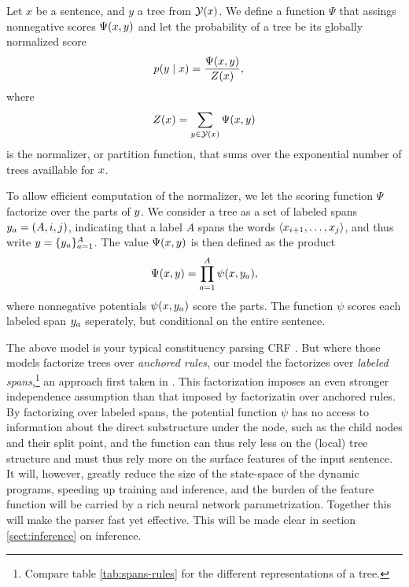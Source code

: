   Let $x$ be a sentence, and $y$ a tree from $\mathcal{Y}(x)$. We define a function $\Psi$ that assings nonnegative scores $\Psi(x, y)$ and let the probability of a tree be its globally normalized score
  \begin{align}
    \label{eq:crf-model}
    p(y \mid x) &= \frac{\Psi(x, y)}{Z(x)},
  \end{align}
  where
  \begin{align*}
    Z(x) = \sum_{ y \in \mathcal{Y}(x) } \Psi(x, y)
  \end{align*}
  is the normalizer, or partition function, that sums over the exponential number of trees availlable for $x$.

  To allow efficient computation of the normalizer, we let the scoring function $\Psi$ factorize over the parts of $y$. We consider a tree as a set of labeled spans $y_a = (A, i, j)$, indicating that a label $A$ spans the words $\langle x_{i+1}, \dots, x_j \rangle$, and thus write $y = \{ y_a \}_{a=1}^A$. The value $\Psi(x, y)$ is then defined as the product
  \begin{align}
    \Psi(x, y) = \prod_{a=1}^A \psi(x, y_a),
  \end{align}
  where nonnegative potentials $\psi(x, y_a)$ score the parts. The function $\psi$ scores each labeled span $y_a$ seperately, but conditional on the entire sentence.

  The above model is your typical constituency parsing CRF \citep{finkel2008crf,klein2015crf}. But where those models factorize trees over \textit{anchored rules}, our model the factorizes over \textit{labeled spans},\footnote{Compare table \ref{tab:spans-rules} for the different representations of a tree.} an approach first taken in \citet{stern2017minimal}. This factorization imposes an even stronger independence assumption than that imposed by factorizatin over anchored rules. By factorizing over labeled spans, the potential function $\psi$ has no access to information about the direct substructure under the node, such as the child nodes and their split point, and the function can thus rely less on the (local) tree structure and must thus rely more on the surface features of the input sentence. It will, however, greatly reduce the size of the state-space of the dynamic programs, speeding up training and inference, and the burden of the feature function will be carried by a rich neural network parametrization. Together this will make the parser fast yet effective. This will be made clear in section \ref{sect:inference} on inference.

